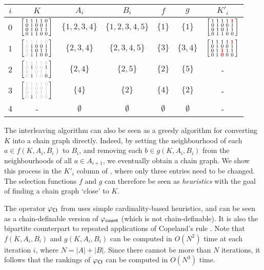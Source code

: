 \begin{table}
	\def\es{\emptyset}

	\begin{tabular}{ccccccc}
\toprule
$i$ & $K$        & $A_i$         & $B_i$           & $f$         & $g$       & $K'_i$    \\
\midrule
$0$ & $\left[ \begin{smallmatrix} 1 & 1 & 1 & 1 & 0 \\ 0 & 1 & 0 & 0 & 1 \\ 0 & 1 & 0 & 1 & 1 \\ 0 & 1 & 1 & 0 & 0 \\ \end{smallmatrix} \right]$   & $\{1,2,3,4\}$ & $\{1,2,3,4,5\}$ & $\{1\}$     & $\{1\}$   & $\left[ \begin{smallmatrix} 1 & 1 & 1 & 1 & \bm{{\color{red}1}} \\ 0 & 1 & 0 & 0 & 1 \\ 0 & 1 & 0 & 1 & 1 \\ 0 & 1 & 1 & 0 & 0 \\ \end{smallmatrix} \right]$ \\[2mm]
$1$ & $\kone$    & $\{2,3,4\}$   & $\{2,3,4,5\}$   & $\{3\}$     & $\{3,4\}$ & $\left[ \begin{smallmatrix} 1 & 1 & 1 & 1 & \bm{{\color{red}1}} \\ 0 & 1 & 0 & 0 & 1 \\ 0 & 1 & \bm{{\color{red}1}} & 1 & 1 \\ 0 & 1 & \bm{{\color{red}0}} & 0 & 0 \\ \end{smallmatrix} \right]$  \\[2mm]
$2$ & $\ktwo$    & $\{2,4\}$     & $\{2,5\}$       & $\{2\}$     & $\{5\}$   & -         \\[2mm]
$3$ & $\kthree$  & $\{4\}$       & $\{2\}$         & $\{4\}$     & $\{2\}$   & -         \\[2mm]
$4$ & -          & $\es$         & $\es$    	   & $\es$       & $\es$     & -         \\
\bottomrule
	\end{tabular}
\end{table}

The interleaving algorithm can also be seen as a greedy algorithm for
converting $K$ into a chain graph directly. Indeed, by setting the
neighbourhood of each $a \in f(K, A_i, B_i)$ to $B_i$, and removing each $b \in
g(K, A_i, B_i)$ from the neighbourhoods of all $a \in A_{i+1}$, we eventually
obtain a chain graph. We show this process in the $K'_i$ column of
, where only three entries need to be
changed.\footnotemark{} The selection functions $f$ and $g$ can therefore be
seen as \emph{heuristics} with the goal of finding a chain graph `close' to
$K$.


The operator ${\varphi_{\mathsf{CI}}}$ from  uses simple cardinality-based
heuristics, and can be seen as a chain-definable version of ${\varphi_{\mathsf{count}}}$ (which
is not chain-definable). It is also the bipartite counterpart to repeated
applications of Copeland's rule \cite{bouyssou2004monotonicity}. Note that
$f(K, A_i, B_i)$ and $g(K, A_i, B_i)$ can be computed in $O(N^2)$ time at each
iteration $i$, where $N = |A| + |B|$. Since there cannot be more than $N$
iterations, it follows that the rankings of ${\varphi_{\mathsf{CI}}}$ can be computed in
$O(N^3)$ time.

